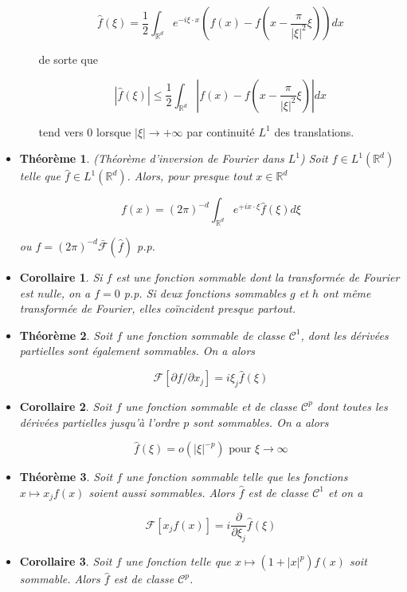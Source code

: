 \documentclass[10pt,a4paper,oneside]{article}
\newtheorem{theoreme}{Théorème}
\newtheorem{corollaire}{Corollaire}
\begin{document}
\begin{itemize}
\begin{itemize}
\[ \hat{f}(\xi) = \frac{1}{2} \int_{\mathbb{R}^d} e^{-i \xi \cdot x} \left( f(x) - f(x - \frac{\pi}{|\xi|^2}\xi) \right) dx \]

de sorte que

\[ |\hat{f}(\xi)| \leq \frac{1}{2} \int_{\mathbb{R}^d} | f(x) - f(x - \frac{\pi}{|\xi|^2}\xi) | dx \]

tend vers 0 lorsque $|\xi| \to +\infty$ par continuité $L^1$ des translations.

\end{itemize}

\item
\begin{theoreme}
(Théorème d'inversion de Fourier dans $L^1$)
Soit $f \in L^1(\mathbb{R}^d)$ telle que $\hat{f} \in L^1(\mathbb{R}^d)$. Alors, pour presque tout $x \in \mathbb{R}^d$

\[ f(x) = (2\pi)^{-d} \int_{\mathbb{R}^d} e^{+i x \cdot \xi} \hat{f}(\xi) d\xi \]

ou $f = (2\pi)^{-d} \bar{\mathcal{F}}(\hat{f})$ p.p.
\end{theoreme}

\item
\begin{corollaire}
Si $f$ est une fonction sommable dont la transformée de Fourier est nulle, on a $f = 0$ p.p. Si deux fonctions sommables $g$ et $h$ ont même transformée de Fourier, elles coïncident presque partout.
\end{corollaire}

\item
\begin{theoreme}
Soit $f$ une fonction sommable de classe $\mathcal{C}^1$, dont les dérivées partielles sont également sommables. On a alors

\[ \mathcal{F}[\partial f / \partial x_j] = i \xi_j \hat{f}(\xi) \]
\end{theoreme}

\item
\begin{corollaire}
Soit $f$ une fonction sommable et de classe $\mathcal{C}^p$ dont toutes les dérivées partielles jusqu'à l'ordre $p$ sont sommables. On a alors

\[ \hat{f}(\xi) = o(|\xi|^{-p}) \text{ pour } \xi \to \infty \]
\end{corollaire}

\item
\begin{theoreme}
Soit $f$ une fonction sommable telle que les fonctions $x \mapsto x_j f(x)$ soient aussi sommables. Alors $\hat{f}$ est de classe $\mathcal{C}^1$ et on a

\[ \mathcal{F}[x_j f(x)] = i \frac{\partial}{\partial \xi_j}\hat{f}(\xi) \]
\end{theoreme}

\item
\begin{corollaire}
Soit $f$ une fonction telle que $x \mapsto (1 + |x|^p)f(x)$ soit sommable. Alors $\hat{f}$ est de classe $\mathcal{C}^p$.
\end{corollaire}

\end{itemize}
\end{document}
